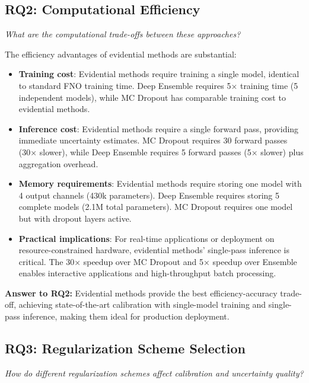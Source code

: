 \subsection{RQ2: Computational Efficiency}

\textit{What are the computational trade-offs between these approaches?}

The efficiency advantages of evidential methods are substantial:

\begin{itemize}
\item \textbf{Training cost}: Evidential methods require training a single model, identical to standard FNO training time. Deep Ensemble requires 5× training time (5 independent models), while MC Dropout has comparable training cost to evidential methods.

\item \textbf{Inference cost}: Evidential methods require a single forward pass, providing immediate uncertainty estimates. MC Dropout requires 30 forward passes (30× slower), while Deep Ensemble requires 5 forward passes (5× slower) plus aggregation overhead.

\item \textbf{Memory requirements}: Evidential methods require storing one model with 4 output channels (430k parameters). Deep Ensemble requires storing 5 complete models (2.1M total parameters). MC Dropout requires one model but with dropout layers active.

\item \textbf{Practical implications}: For real-time applications or deployment on resource-constrained hardware, evidential methods' single-pass inference is critical. The 30× speedup over MC Dropout and 5× speedup over Ensemble enables interactive applications and high-throughput batch processing.
\end{itemize}

\textbf{Answer to RQ2:} Evidential methods provide the best efficiency-accuracy trade-off, achieving state-of-the-art calibration with single-model training and single-pass inference, making them ideal for production deployment.

\subsection{RQ3: Regularization Scheme Selection}

\textit{How do different regularization schemes affect calibration and uncertainty quality?}

